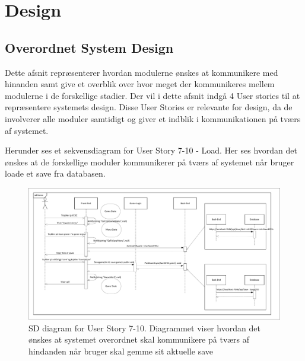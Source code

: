 \section{Design}


\subsection{Overordnet System Design}
\noindent Dette afsnit repræsenterer hvordan modulerne ønskes at kommunikere med hinanden samt give et overblik over hvor meget der kommunikeres mellem modulerne i de forskellige stadier. Der vil i dette afsnit indgå 4 User stories til at repræsentere systemets design. Disse User Stories er relevante for design, da de involverer alle moduler samtidigt og giver et indblik i kommunikationen på tværs af systemet.

\noindent Herunder ses et sekvensdiagram for User Story 7-10 - Load. Her ses hvordan det ønskes at de forskellige moduler kommunikerer på tværs af systemet når bruger loade et save fra databasen.
\begin{figure}[h]
\centering
\includegraphics[width = \textwidth]{02-Body/Images/Arkitektur - SD Save Game}
\caption{SD diagram for User Story 7-10. Diagrammet viser hvordan det ønskes at systemet overordnet skal kommunikere på tværs af hindanden når bruger skal gemme sit aktuelle save}
\label{fig:Arkitektur-SD-SaveGame}
\end{figure}

